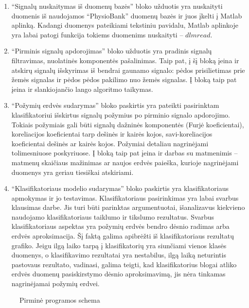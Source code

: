 \documentclass[]{vgtuef}
\begin{document}
\begin{enumerate}
\item ``Signalų nuskaitymas iš duomenų bazės'' bloko užduotis yra nuskaityti duomenis iš naudojamos ``PhysioBank'' duomenų bazės ir juos įkelti į Matlab aplinką. Kadangi duomenys pateikiami tekstiniu pavidalu, Matlab aplinkoje yra labai patogi funkcija tokiems duomenims nuskaityti -- $dlmread$.

\item ``Pirminis signalų apdorojimas'' bloko užduotis yra pradinis signalų filtravimas, nuolatinės komponentės pašalinimas. Taip pat, į šį bloką įeina ir atskirų signalų išskyrimas iš bendrai gaunamo signalo: pėdos prisilietimas prie žemės signalas ir pėdos pėdos pakilimo nuo žemės signalas. Į bloką taip pat įeina ir slankiojančio lango algoritmo taikymas.

\item ``Požymių erdvės sudarymas'' bloko paskirtis yra pateikti pasirinktam klasifikatoriui išskirtus signalų požymius po pirminio signalo apdorojimo. Tokiais požymiais gali būti signalų dažninės komponentės (Furjė koeficientai), koreliacijos koeficientai tarp dešinės ir kairės kojos, savi-koreliacijos koeficientai dešinės ar kairės kojos. Požymiai detaliau nagrinėjami tolimesniuose poskyriuose. Į bloką taip pat įeina ir darbas su matmenimis -- matmenų skaičiaus mažinimas ar naujos erdvės paieška, kurioje nagrinėjami duomenys yra geriau tiesiškai atskiriami.

\item ``Klasifikatoriaus modelio sudarymas'' bloko paskirtis yra klasifikatoriaus apmokymas ir jo testavimas. Klasifikatoriaus pasirinkimas yra labai svarbus klausimas darbe. Jis turi būti parinktas argumentuotai, išanalizavus kiekvieno naudojamo klasifikatoriaus taiklumo ir tikslumo rezultatus. Svarbus klasifikatoriaus aspektas yra požymių erdvės bendro dėsnio radimas arba erdvės aproksimacija. Šį faktą galima apibrėžti iš klasifikatoriaus rezultatų grafiko. Jeigu ilgą laiko tarpą į klasifikatorių yra siunčiami vienos klasės duomenys, o klasifikavimo rezultatai yra nestabilus, ilgą laiką neturintis pastovaus rezultato, vadinasi, galima teigti, kad klasifikatorius blogai atliko erdvės duomenų pasiskirstymo dėsnio aproksimavimą, jis nėra tinkamas nagrinėjamai požymių erdvei.
\end{enumerate}

\begin{figure}
  \centering
	
  \caption{Pirminė programos schema}
  \label{fig:pirmine_programos_schema}
\end{figure}
\end{document}
